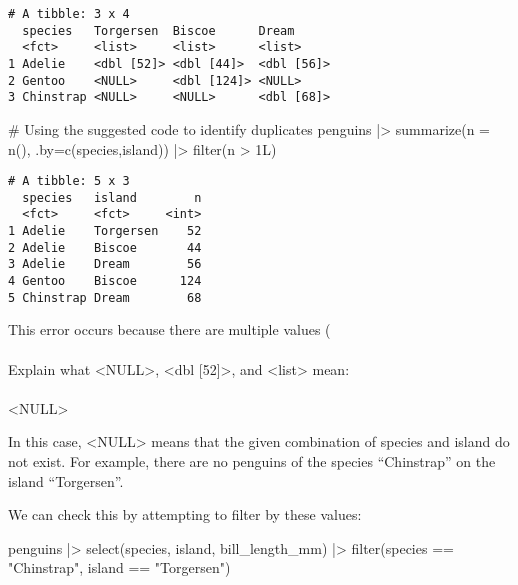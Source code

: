 \documentclass[
  letterpaper,
  DIV=11,
  numbers=noendperiod]{scrartcl}
\makeatletter
\let\oldparagraph\paragraph
\renewcommand{\paragraph}{
    \@ifstar
      \xxxParagraphStar
      \xxxParagraphNoStar
  }
\newcommand{\xxxParagraphStar}[1]{\oldparagraph*{#1}\mbox{}}
\newcommand{\xxxParagraphNoStar}[1]{\oldparagraph{#1}\mbox{}}
\newenvironment{Shaded}{\begin{snugshade}}{\end{snugshade}}
\newcommand{\AttributeTok}[1]{\textcolor[rgb]{0.40,0.45,0.13}{#1}}
\newcommand{\CommentTok}[1]{\textcolor[rgb]{0.37,0.37,0.37}{#1}}
\newcommand{\DecValTok}[1]{\textcolor[rgb]{0.68,0.00,0.00}{#1}}
\newcommand{\FunctionTok}[1]{\textcolor[rgb]{0.28,0.35,0.67}{#1}}
\newcommand{\NormalTok}[1]{\textcolor[rgb]{0.00,0.23,0.31}{#1}}
\newcommand{\SpecialCharTok}[1]{\textcolor[rgb]{0.37,0.37,0.37}{#1}}
\newcommand{\StringTok}[1]{\textcolor[rgb]{0.13,0.47,0.30}{#1}}
\makeatother
\begin{document}
\begin{verbatim}
# A tibble: 3 x 4
  species   Torgersen  Biscoe      Dream     
  <fct>     <list>     <list>      <list>    
1 Adelie    <dbl [52]> <dbl [44]>  <dbl [56]>
2 Gentoo    <NULL>     <dbl [124]> <NULL>    
3 Chinstrap <NULL>     <NULL>      <dbl [68]>
\end{verbatim}

\begin{Shaded}
\begin{Highlighting}[]
\CommentTok{\# Using the suggested code to identify duplicates}
\NormalTok{penguins }\SpecialCharTok{|\textgreater{}} \FunctionTok{summarize}\NormalTok{(}\AttributeTok{n =} \FunctionTok{n}\NormalTok{(), }\AttributeTok{.by=}\FunctionTok{c}\NormalTok{(species,island)) }\SpecialCharTok{|\textgreater{}} \FunctionTok{filter}\NormalTok{(n }\SpecialCharTok{\textgreater{}} \DecValTok{1}\NormalTok{L)}
\end{Highlighting}
\end{Shaded}

\begin{verbatim}
# A tibble: 5 x 3
  species   island        n
  <fct>     <fct>     <int>
1 Adelie    Torgersen    52
2 Adelie    Biscoe       44
3 Adelie    Dream        56
4 Gentoo    Biscoe      124
5 Chinstrap Dream        68
\end{verbatim}

This error occurs because there are multiple values (

\paragraph{Explain what \textless NULL\textgreater, \textless dbl
{[}52{]}\textgreater, and \textless list\textgreater{}
mean:}\label{explain-what-null-dbl-52-and-list-mean}

\paragraph{\textless NULL\textgreater{}}\label{null}

In this case, \textless NULL\textgreater{} means that the given
combination of species and island do not exist. For example, there are
no penguins of the species ``Chinstrap'' on the island ``Torgersen''.

We can check this by attempting to filter by these values:

\begin{Shaded}
\begin{Highlighting}[]
\NormalTok{penguins }\SpecialCharTok{|\textgreater{}} \FunctionTok{select}\NormalTok{(species, island, bill\_length\_mm) }\SpecialCharTok{|\textgreater{}} \FunctionTok{filter}\NormalTok{(species }\SpecialCharTok{==} \StringTok{"Chinstrap"}\NormalTok{, island }\SpecialCharTok{==} \StringTok{"Torgersen"}\NormalTok{)}
\end{Highlighting}
\end{Shaded}
\end{document}

